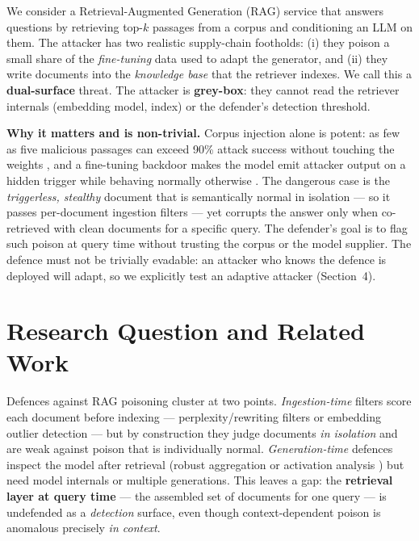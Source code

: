 \documentclass[11pt,a4paper]{article}
\begin{document}
We consider a Retrieval-Augmented Generation (RAG) service \cite{lewis2020rag} that
answers questions by retrieving top-$k$ passages from a corpus and conditioning an LLM
on them. The
attacker has two realistic supply-chain footholds: (i) they poison a small share of
the \emph{fine-tuning} data used to adapt the generator, and (ii) they write
documents into the \emph{knowledge base} that the retriever indexes. We call this a
\textbf{dual-surface} threat. The attacker is \textbf{grey-box}: they cannot read the
retriever internals (embedding model, index) or the defender's detection threshold.

\textbf{Why it matters and is non-trivial.} Corpus injection alone is potent: as few
as five malicious passages can exceed 90\% attack success without touching the weights
\cite{cheng2024trojanrag,zou2024poisonedrag}, and a fine-tuning backdoor makes the
model emit attacker output on a hidden trigger while behaving normally otherwise
\cite{wan2023poisoning}. The dangerous case is the \emph{triggerless, stealthy}
document that is semantically normal in isolation --- so it passes per-document
ingestion filters --- yet corrupts the answer only when co-retrieved with clean
documents for a specific query. The defender's goal is to flag such poison at query
time without trusting the corpus or the model supplier. The defence must not be
trivially evadable: an attacker who knows the defence is deployed will adapt, so we
explicitly test an adaptive attacker (Section~4).

\section{Research Question and Related Work}

Defences against RAG poisoning cluster at two points. \emph{Ingestion-time} filters
score each document before indexing --- perplexity/rewriting filters \cite{qi2021onion}
or embedding outlier detection --- but by construction they judge documents
\emph{in isolation} and are weak against poison that is individually normal.
\emph{Generation-time} defences inspect the model after retrieval (robust aggregation
or activation analysis \cite{xiang2024robustrag}) but need model internals or multiple
generations. This leaves a gap: the \textbf{retrieval layer at query time} --- the
assembled set of documents for one query --- is undefended as a \emph{detection}
surface, even though context-dependent poison is anomalous precisely \emph{in context}.
\end{document}
